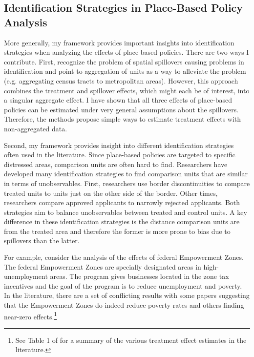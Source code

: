 \documentclass[11pt]{article}
\begin{document}
\subsection{Identification Strategies in Place-Based Policy Analysis}\label{sec:pbp}

More generally, my framework provides important insights into identification strategies when analyzing the effects of place-based policies. There are two ways I contribute. First, \citet{Baum-Snow_Ferreira_2015} recognize the problem of spatial spillovers causing problems in identification and point to aggregation of units as a way to alleviate the problem (e.g. aggregating census tracts to metropolitan areas). However, this approach combines the treatment and spillover effects, which might each be of interest, into a singular aggregate effect. I have shown that all three effects of place-based policies can be estimated under very general assumptions about the spillovers. Therefore, the methods propose simple ways to estimate treatment effects with non-aggregated data.

Second, my framework provides insight into different identification strategies often used in the literature. Since place-based policies are targeted to specific distressed areas, comparison units are often hard to find. Researchers have developed many identification strategies to find comparison units that are similar in terms of unobservables. First, researchers use border discontinuities to compare treated units to units just on the other side of the border. Other times, researchers compare approved applicants to narrowly rejected applicants. Both strategies aim to balance unobservables between treated and control units. A key difference in these identification strategies is the distance comparison units are from the treated area and therefore the former is more prone to bias due to spillovers than the latter.

For example, consider the analysis of the effects of federal Empowerment Zones. The federal Empowerment Zones are specially designated areas in high-unemployment areas. The program gives businesses located in the zone tax incentives and the goal of the program is to reduce unemployment and poverty. In the literature, there are a set of conflicting results with some papers suggesting that the Empowerment Zones do indeed reduce poverty rates and others finding near-zero effects.\footnote{See Table 1 of \citet{Neumark_Young_2019} for a summary of the various treatment effect estimates in the literature.} 
\end{document}
